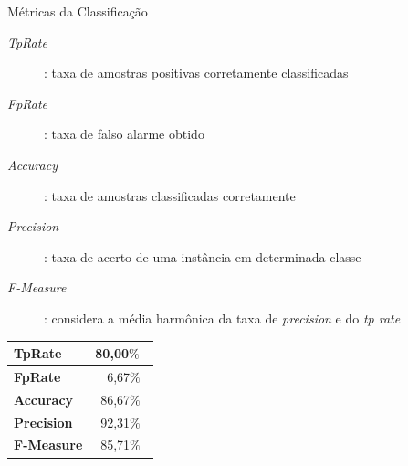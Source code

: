 \documentclass{beamer}
\begin{document}
\begin{frame}{Métricas da Classificação}
				
		\begin{description}
			\item [\textit{TpRate}]: taxa de amostras positivas corretamente classificadas
			\item [\textit{FpRate}]: taxa de falso alarme obtido 
			\item [\textit{Accuracy}]:  taxa de amostras classificadas corretamente 
			\item [\textit{Precision}]: taxa de acerto de uma instância em determinada classe 
			\item [\textit{F-Measure}]: considera a média harmônica da taxa de \textit{precision} e do \textit{tp rate} 
		\end{description}

		
		\begin{table}[!htbp]
				\label{table:metricasmatrizconfusao}
				\centering
				\begin{tabular}{|l|r|}
				\hline
				\textbf{TpRate}                    & 80,00$\%$\               \\ \hline
				\textbf{FpRate}                    & 6,67$\%$\                \\ \hline
				\textbf{Accuracy}                  & 86,67$\%$\                \\ \hline
				\textbf{Precision}                 & 92,31$\%$\                \\ \hline
				\textbf{F-Measure}                 & 85,71$\%$\                \\ \hline
				\end{tabular}
		\end{table}

\end{frame}
\end{document}
